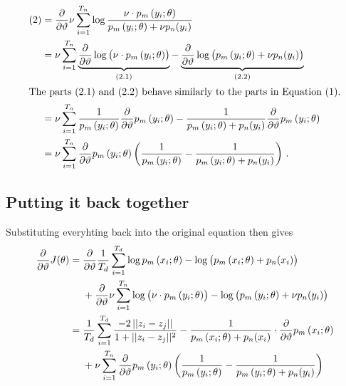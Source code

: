 \documentclass[a4paper,12pt]{article}
\newcommand{\pmodel}[1]{\ensuremath p_m\left(#1; \theta\right)}
\newcommand{\pnoise}[1]{\ensuremath p_n(#1)}
\newcommand{\dtheta}{\ensuremath \frac{\partial}{\partial\vartheta}}
\begin{document}
\begin{align*}
  (2) &= \dtheta\nu \sum_{i=1}^{T_n} \log \frac{\nu \cdot \pmodel{y_i}}{\pmodel{y_i} + \nu\pnoise{y_i}} \\
      &= \nu \sum_{i=1}^{T_n} \underbrace{\dtheta\log \big({\nu \cdot \pmodel{y_i}}\big)}_{(2.1)}
        - \underbrace{\dtheta\log\big(  {\pmodel{y_i} + \nu\pnoise{y_i}}\big)}_{(2.2)} \\
  \intertext{The parts $(2.1)$ and $(2.2)$ behave similarly to the parts in Equation $(1)$.}
      &= \nu \sum_{i=1}^{T_n} \frac{1}{\pmodel{y_i}}\dtheta\pmodel{y_i} - \frac{1}{\pmodel{y_i} + \pnoise{y_i}}\dtheta\pmodel{y_i}\\
      &= \nu \sum_{i=1}^{T_n} \dtheta\pmodel{y_i} \left(  \frac{1}{\pmodel{y_i}} - \frac{1}{\pmodel{y_i} + \pnoise{y_i}}\right)\,.
\end{align*}

\subsection*{Putting it back together}
Substituting everyhting back into the original equation then gives
\begin{align*}
  \dtheta J(\theta) =\; &\dtheta\frac{1}{T_d} \sum_{i=1}^{T_d} \log {\pmodel{x_i}} - \log\big({\pmodel{x_i} + \pnoise{x_i}}\big)\\
                        &+ \dtheta\nu \sum_{i=1}^{T_n} \log \big({\nu \cdot \pmodel{y_i}}\big) - \log\big({\pmodel{y_i} + \nu\pnoise{y_i}}\big) \\
  =\; &\frac{1}{T_d} \sum_{i=1}^{T_d} \frac{-2\,||z_i - z_j||}{1+||z_i - z_j||^2} - \frac{1}{\pmodel{x_i} + \pnoise{x_i}} \cdot \dtheta \pmodel{x_i}\\
                        &+ \nu \sum_{i=1}^{T_n} \dtheta\pmodel{y_i} \left(  \frac{1}{\pmodel{y_i}} - \frac{1}{\pmodel{y_i} + \pnoise{y_i}}\right)
\end{align*}
\end{document}
